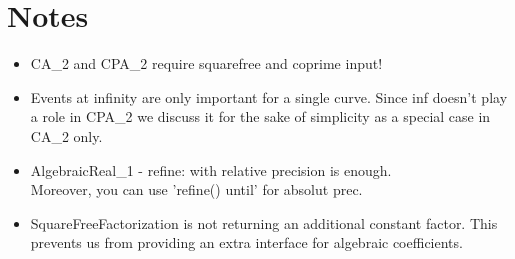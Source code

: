 \section{Notes}
\begin{itemize}
 \item CA\_2 and CPA\_2 require squarefree and coprime input! 
 \item Events at infinity are only important for a single curve. Since
   inf doesn't play a role in CPA\_2 we discuss it for the sake of
   simplicity as a special case in CA\_2 only. 
\item AlgebraicReal\_1 - refine: with relative precision is enough. \\
      Moreover, you can use 'refine() until' for absolut prec.
\item SquareFreeFactorization is not returning an additional constant 
      factor. This prevents us from providing an extra interface for 
      algebraic coefficients.
\end{itemize}

